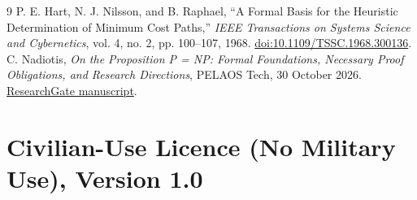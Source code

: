 \documentclass[11pt,a4paper]{article}
\begin{document}
\begin{thebibliography}{9}
 P. E. Hart, N. J. Nilsson, and B. Raphael, ``A Formal Basis for the Heuristic Determination of Minimum Cost Paths,'' \emph{IEEE Transactions on Systems Science and Cybernetics}, vol. 4, no. 2, pp. 100--107, 1968. \href{https://doi.org/10.1109/TSSC.1968.300136}{doi:10.1109/TSSC.1968.300136}.
 C. Nadiotis, \emph{On the Proposition P = NP: Formal Foundations, Necessary Proof Obligations, and Research Directions}, PELAOS Tech, 30 October 2026. \href{https://www.researchgate.net/publication/417206732_On_the_Proposition_P_NP_Formal_Foundations_Necessary_Proof_Obligations_and_Research_Directions}{ResearchGate manuscript}.
\end{thebibliography}

\appendix
\section{Civilian-Use Licence (No Military Use), Version 1.0}\label{app:licence}

\end{document}
